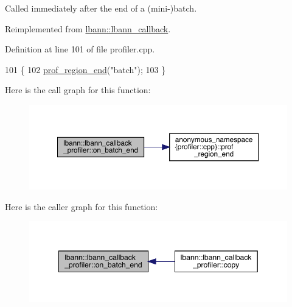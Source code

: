 Called immediately after the end of a (mini-\/)batch. 

Reimplemented from \hyperlink{classlbann_1_1lbann__callback_a895ca577e358601fcae5c04749f60535}{lbann\+::lbann\+\_\+callback}.



Definition at line 101 of file profiler.\+cpp.


\begin{DoxyCode}
101                                                    \{
102   \hyperlink{namespaceanonymous__namespace_02profiler_8cpp_03_a7984c26fb186307873a2f83f91715a99}{prof\_region\_end}(\textcolor{stringliteral}{"batch"});  
103 \}
\end{DoxyCode}
Here is the call graph for this function\+:\nopagebreak
\begin{figure}[H]
\begin{center}
\leavevmode
\includegraphics[width=350pt]{classlbann_1_1lbann__callback__profiler_ad7db0233f3a0c91c10a15d0951bb1747_cgraph}
\end{center}
\end{figure}
Here is the caller graph for this function\+:\nopagebreak
\begin{figure}[H]
\begin{center}
\leavevmode
\includegraphics[width=349pt]{classlbann_1_1lbann__callback__profiler_ad7db0233f3a0c91c10a15d0951bb1747_icgraph}
\end{center}
\end{figure}
\mbox{\label{classlbann_1_1lbann__callback__profiler_abd30d11df631eea086cdf213c9f0f4f9}} 
